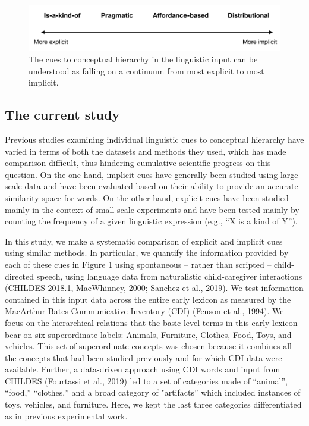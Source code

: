 \documentclass[english,,man]{apa6}
\begin{document}
\begin{figure}[h]

{\centering \includegraphics{child_language_journal_files/figure-latex/cues-1} 

}

\caption{\label{fig:cues} The cues to conceptual hierarchy in the linguistic input can be understood as falling on a continuum from most explicit to most implicit.}\label{fig:cues}
\end{figure}

\hypertarget{the-current-study}{%
\subsection{The current study}\label{the-current-study}}

Previous studies examining individual linguistic cues to conceptual hierarchy have varied in terms of both the datasets and methods they used, which has made comparison difficult, thus hindering cumulative scientific progress on this question. On the one hand, implicit cues have generally been studied using large-scale data and have been evaluated based on their ability to provide an accurate similarity space for words. On the other hand, explicit cues have been studied mainly in the context of small-scale experiments and have been tested mainly by counting the frequency of a given linguistic expression (e.g., \enquote{X is a kind of Y}).

In this study, we make a systematic comparison of explicit and implicit cues using similar methods. In particular, we quantify the information provided by each of these cues in Figure 1 using spontaneous -- rather than scripted -- child-directed speech, using language data from naturalistic child-caregiver interactions (CHILDES 2018.1, MacWhinney, 2000; Sanchez et al., 2019). We test information contained in this input data across the entire early lexicon as measured by the MacArthur-Bates Communicative Inventory (CDI) (Fenson et al., 1994). We focus on the hierarchical relations that the basic-level terms in this early lexicon bear on six superordinate labels: Animals, Furniture, Clothes, Food, Toys, and vehicles. This set of superordinate concepts was chosen because it combines all the concepts that had been studied previously and for which CDI data were available. Further, a data-driven approach using CDI words and input from CHILDES (Fourtassi et al., 2019) led to a set of categories made of \enquote{animal}, \enquote{food,} \enquote{clothes,} and a broad category of "artifacts'' which included instances of toys, vehicles, and furniture. Here, we kept the last three categories differentiated as in previous experimental work.
\end{document}
